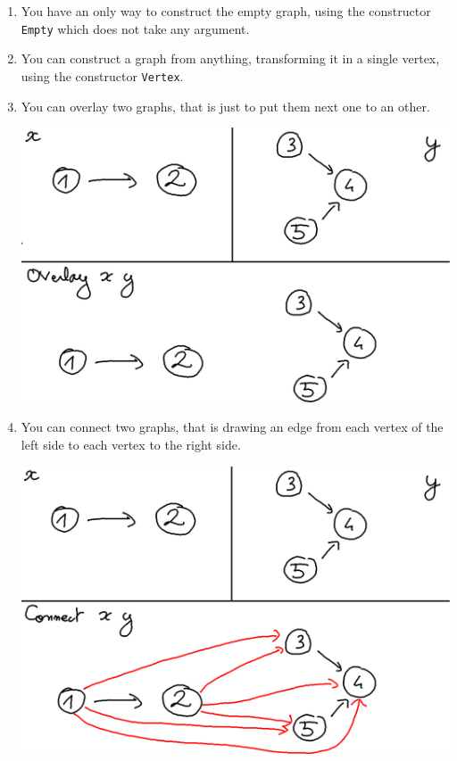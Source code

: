 \documentclass[10pt,a4paper]{article}
\begin{document}
\begin{enumerate}
\item You have an only way to construct the empty graph, using the constructor \verb|Empty| which does not take any argument.

\item You can construct a graph from anything, transforming it in a single vertex, using the constructor \verb|Vertex|.

\item You can overlay two graphs, that is just to put them next one to an other.

\begin{center}
	\includegraphics[scale=0.4]{figspng/overlay.png}
\end{center}

\item You can connect two graphs, that is drawing an edge from each vertex of the left side to each vertex to the right side.

\begin{center}
	\includegraphics[scale=0.4]{figspng/connect.png}
\end{center}

\end{enumerate}
\end{document}
